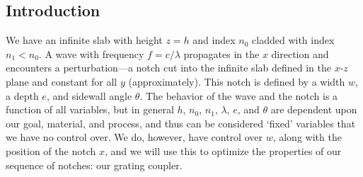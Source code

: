 \documentclass[10pt, letter, oneside,graphicx]{article}
\begin{document}
\subsection{Introduction}
We have an infinite slab with height $z = h$ and index $n_0$ cladded with index $n_1 < n_0$. A wave with frequency $f = c/\lambda$ propagates in the $x$ direction and encounters a perturbation---a notch cut into the infinite slab defined in the $x$-$z$ plane and constant for all $y$ (approximately). This notch is defined by a width $w$, a depth $e$, and sidewall angle $\theta$. The behavior of the wave and the notch is a function of all variables, but in general $h$, $n_0$, $n_1$, $\lambda$, $e$, and $\theta$ are dependent upon our goal, material, and process, and thus can be considered `fixed' variables that we have no control over. We do, however, have control over $w$, along with the position of the notch $x$, and we will use this to optimize the properties of our sequence of notches: our grating coupler.
\end{document}

